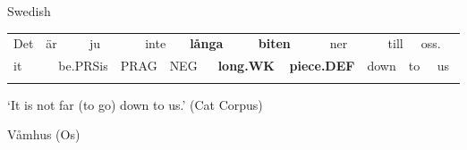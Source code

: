 \begin{listWWNumileveli}
\item {}

\begin{styleExample}
Swedish

\end{styleExample}

\end{listWWNumileveli}

\begin{tabular}{llllllllllllllllll}
\lsptoprule
Det & \multicolumn{2}{l}{är

} & \multicolumn{2}{l}{ju

} & \multicolumn{2}{l}{inte

} & \multicolumn{2}{l}{{\bfseries långa}

} & \multicolumn{2}{l}{{\bfseries biten}

} & \multicolumn{2}{l}{ner

} & \multicolumn{2}{l}{till

} & \multicolumn{2}{l}{oss.

} & \\
\multicolumn{2}{l}{it

} & \multicolumn{2}{l}{be.PRSis

} & \multicolumn{2}{l}{PRAG

} & \multicolumn{2}{l}{NEG

} & \multicolumn{2}{l}{{\bfseries long.WK}

} & \multicolumn{2}{l}{{\bfseries piece.DEF}

} & \multicolumn{2}{l}{down

} & \multicolumn{2}{l}{to

} & \multicolumn{2}{l}{us

}\\
\lspbottomrule
\end{tabular}

\begin{styleTranslation}
‘It is not far (to go) down to us.’ (Cat Corpus)

\end{styleTranslation}

\begin{listWWNumileveli}
\item {}

\begin{styleExample}
Våmhus (Os) 

\end{styleExample}

\end{listWWNumileveli}

